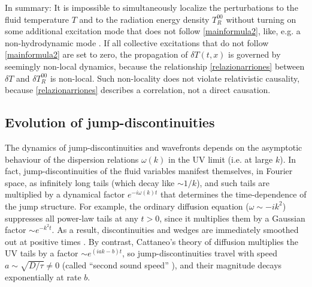 \documentclass[a4paper, amsfonts, amssymb, amsmath, reprint, showkeys, nofootinbib, twoside,notitlepage,onecolumn]{revtex4-2}
\theoremstyle{definition}
\theoremstyle{theorem}
\theoremstyle{corollary}
\begin{document}
In summary: It is impossible to simultaneously localize the perturbations to the fluid temperature $T$ and to the radiation energy density $T_R^{00}$ without turning on some additional excitation mode that does not follow \eqref{mainformula2}, like, e.g. a non-hydrodynamic mode \cite{GavassinoGapless2024rck}. If all collective excitations that do not follow \eqref{mainformula2} are set to zero, the propagation of $\delta T(t,x)$ is governed by seemingly non-local dynamics, because the relationship \eqref{relazionarriones} between $\delta T$ and $\delta T_R^{00}$ is non-local. Such non-locality does not violate relativistic causality, because \eqref{relazionarriones} describes a correlation, not a direct causation.


\subsection{Evolution of jump-discontinuities}
\vspace{-0.2cm}

The dynamics of jump-discontinuities and wavefronts depends on the asymptotic behaviour of the dispersion relations $\omega(k)$ in the UV limit (i.e. at large $k$). In fact, jump-discontinuities of the fluid variables manifest themselves, in Fourier space, as infinitely long tails (which decay like $\sim 1/k$), and such tails are multiplied by a dynamical factor $e^{-i\omega(k)t}$ that determines the time-dependence of the jump structure. For example, the ordinary diffusion equation ($\omega {\sim} -ik^2$) suppresses all power-law tails at any $t>0$, since it multiplies them by a Gaussian factor $\sim e^{-k^2 t}$. As a result, discontinuities and wedges are immediately smoothed out at positive times \cite[\S 2.3.3]{EvansPDEsBook}. By contrast, Cattaneo's theory of diffusion \cite{cattaneo1958} multiplies the UV tails by a factor $\sim e^{(iak-b)t}$, so jump-discontinuities travel with speed $a\sim \sqrt{D/\tau} \neq 0$ (called ``second sound speed'' \cite{rezzolla_book}), and their magnitude decays exponentially at rate $b$. 
\end{document}
